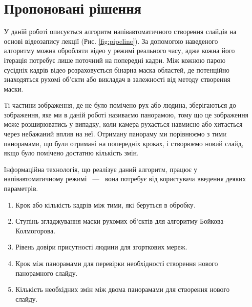 \section{Пропоновані рішення}


У даній роботі описується алгоритм напівавтоматичного
створення слайдів на основі відеозапису лекції (Рис. \ref{fig:pipeline}).
За допомогою наведеного алгоритму можна обробляти відео
у режимі реального часу, адже кожна його ітерація потребує
лише поточний на попередні кадри. Між кожною парою
сусідніх кадрів відео розраховується бінарна маска областей, де
потенційно знаходяться рухомі об'єкти або викладач в залежності від методу
створення маски.

Ті частини зображення, де не було помічено рух або людина,
зберігаються до зображення, яке ми в даній роботі називаємо панорамою, тому що
це зображення може розширюватись у випадку, коли камера рухається
навмисно або хитається через небажаний вплив на неї.
Отриману панораму ми порівнюємо з тими панорамами, що були отримані на
попередніх кроках, і створюємо новий слайд, якщо було помічено
достатню кількість змін.

Інформаційна технологія, що реалізує даний алгоритм, працює у
напівавтоматичному режимі ~---~ вона потребує від користувача введення
деяких параметрів.
\begin{enumerate}
    \item Крок або кількість кадрів між тими, які беруться в обробку.
    \item Ступінь згладжування маски рухомих об'єктів для алгоритму Бойкова-Колмогорова.
    \item Рівень довіри присутності людини для згорткових мереж.
    \item Крок між панорамами для перевірки необхідності створення нового панорамного слайду.
    \item Кількість необхідних змін між двома панорамами для створення нового слайду.
\end{enumerate}

